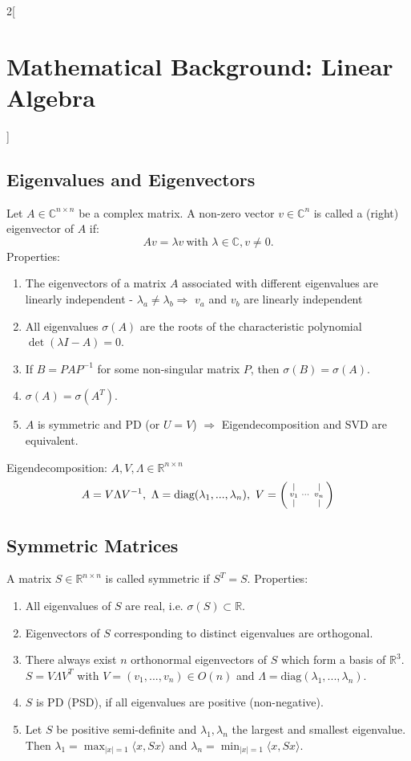 \documentclass[oneside,fontsize=11pt,paper=a4]{scrartcl}
\begin{document}
\begin{multicols}{2}[\section{Mathematical Background: Linear Algebra}]
\subsection{Eigenvalues and Eigenvectors}
Let $A \in \mathbb{C}^{n \times n}$ be a complex matrix. A non-zero vector $v \in \mathbb{C}^{n}$ is called a (right) eigenvector of $A$ if:
\begin{equation*}
    Av = \lambda v \ \text{with } \lambda \in \mathbb{C}, v \neq 0.
\end{equation*}
Properties:
\begin{enumerate}
    \item The eigenvectors of a matrix $A$ associated with different eigenvalues are linearly independent - $\lambda_a \neq \lambda_b \Rightarrow$ $v_a$ and $v_b$ are linearly independent
    \item All eigenvalues $\sigma (A)$ are the roots of the characteristic polynomial $\det(\lambda I-A) = 0$.
    \item If $B = PAP^{-1}$ for some non-singular matrix $P$, then $\sigma (B) = \sigma (A)$.
    \item $\sigma (A) = \sigma (A^T)$.
    \item $A$ is symmetric and PD (or $U = V$) $\Rightarrow$ Eigendecomposition and SVD are equivalent.
\end{enumerate}
Eigendecomposition: $A, V, \Lambda \in \mathbb{R}^{n \times n}$
\begin{equation*}
	A = V \Lambda V^{-1}, \ \Lambda = \text{diag}(\lambda_1, ..., \lambda_n),\
	V =
	\begin{psmallmatrix}
		\vert &  & \vert \\
		v_1 & \cdots  & v_n \\
		\vert &  & \vert \\
	\end{psmallmatrix}
\end{equation*}

\subsection{Symmetric Matrices}
A matrix $S \in \mathbb{R}^{n \times n}$ is called symmetric if $S^T = S$. Properties:
\begin{enumerate}
    \item All eigenvalues of $S$ are real, i.e. $\sigma(S) \subset \mathbb{R}$.
    \item Eigenvectors of $S$ corresponding to distinct eigenvalues are orthogonal.
    \item There always exist $n$ orthonormal eigenvectors of $S$ which form a basis of $\mathbb{R}^3$. $S = V \Lambda V^T$ with $V = (v_1, ..., v_n) \in O(n)$ and $\Lambda = \text{diag}(\lambda_1, ..., \lambda_n)$.
    \item $S$ is PD (PSD), if all eigenvalues are positive (non-negative).
    \item Let $S$ be positive semi-definite and $\lambda_1, \lambda_n$ the largest and smallest eigenvalue. Then $\lambda_1 = \max_{|x|=1} \langle x, Sx \rangle$ and $\lambda_n = \min_{|x|=1} \langle x, Sx \rangle$.
\end{enumerate}


\end{multicols}
\end{document}

